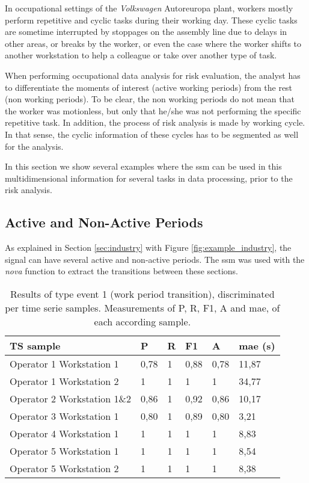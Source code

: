 In occupational settings of the \textit{Volkswagen} Autoreuropa plant, workers mostly perform repetitive and cyclic tasks during their working day. These cyclic tasks are sometime interrupted by stoppages on the assembly line due to delays in other areas, or breaks by the worker, or even the case where the worker shifts to another workstation to help a colleague or take over another type of task.
\par
When performing occupational data analysis for risk evaluation, the analyst has to differentiate the moments of interest (active working periods) from the rest (non working periods). To be clear, the non working periods do not mean that the worker was motionless, but only that he/she was not performing the specific repetitive task. In addition, the process of risk analysis is made by working cycle. In that sense, the cyclic information of these cycles has to be segmented as well for the analysis.
\par
In this section we show several examples where the \gls{ssm} can be used in this multidimensional information for several tasks in data processing, prior to the risk analysis.

\subsection{Active and Non-Active Periods}

As explained in Section \ref{sec:industry} with Figure \ref{fig:example_industry}, the signal can have several active and non-active periods. The \gls{ssm} was used with the \textit{nova} function to extract the transitions between these sections.

\begin{table}
\caption{Results of type event 1 (work period transition), discriminated per time serie samples. Measurements of \gls{P}, \gls{R}, \gls{F1}, \gls{A} and \gls{mae}, of each according sample.}
\label{table:auto_scores}
\centering
\begin{tabular}{llllll}
\toprule
TS sample         & \gls{P}    & \gls{R} & \gls{F1}    & \gls{A}  & \gls{mae} (s) \\
\midrule
Operator 1 Workstation 1      & 0,78 & 1 & 0,88 & 0,78 & 11,87   \\
Operator 1 Workstation 2      & 1    & 1 & 1    & 1    & 34,77   \\
Operator 2 Workstation 1\&2 & 0,86 & 1 & 0,92 & 0,86 & 10,17   \\
Operator 3 Workstation 1    & 0,80 & 1 & 0,89 & 0,80 & 3,21    \\
Operator 4 Workstation 1    & 1    & 1 & 1    & 1    & 8,83    \\
Operator 5 Workstation 1      & 1    & 1 & 1    & 1    & 8,54    \\
Operator 5 Workstation 2      & 1    & 1 & 1    & 1    & 8,38   \\ \hline
\bottomrule
\end{tabular}
\end{table}


